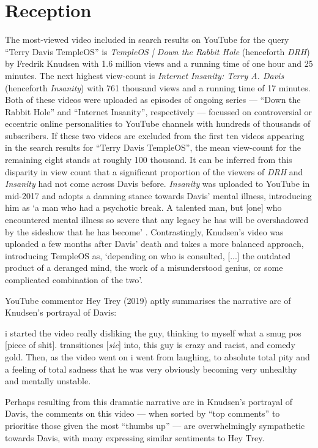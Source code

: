 \documentclass[Draft.tex]{subfiles}
\begin{document}
\section*{Reception}
The most-viewed video included in search results on YouTube
for the query ``Terry Davis TempleOS'' is
\textit{TempleOS | Down the Rabbit Hole} (henceforth \textit{DRH})
by Fredrik Knudsen with 1.6 million views
and a running time of one hour and 25 minutes.
The next highest view-count is \textit{Internet Insanity: Terry A. Davis}
(henceforth \textit{Insanity}) with 761 thousand views and a running time of 17 minutes.
Both of these videos were uploaded as episodes of ongoing series
--- ``Down the Rabbit Hole'' and ``Internet Insanity'', respectively ---
focussed on controversial or eccentric online personalities
to YouTube channels with hundreds of thousands of subscribers.
If these two videos are excluded from the first ten videos appearing
in the search results for ``Terry Davis TempleOS'', the mean view-count
for the remaining eight stands at roughly 100 thousand.
It can be inferred from this disparity in view count that a significant
proportion of the viewers of \textit{DRH} and \textit{Insanity}
had not come across Davis before.
\textit{Insanity} was uploaded to YouTube in mid-2017 and adopts a damning stance
towards Davis' mental illness, introducing him as
`a man who had a psychotic break.
A talented man, but [one] who encountered mental illness so severe
that any legacy he has will be overshadowed
by the sideshow that he has become' \parencite*{Metokur17}.
Contrastingly, Knudsen's \parencite*{Knudsen18} video
was uploaded a few months after Davis' death and
takes a more balanced approach, introducing TempleOS as,
`depending on who is consulted, [...] the outdated product of a deranged mind,
the work of a misunderstood genius, or some complicated combination of the two'.

YouTube commentor Hey Trey (2019) aptly summarises
the narrative arc of Knudsen's portrayal of Davis:
\begin{displayquote}
	i started the video really disliking the guy,
	thinking to myself what a smug pos [piece of shit].
	transitiones [\textit{sic}] into, this guy is crazy and racist, and comedy gold.
	Then, as the video went on i went from laughing, to absolute total pity
	and a feeling of total sadness that he was very obviously
	becoming very unhealthy and mentally unstable.\footnotemark
\end{displayquote}
Perhaps resulting from this dramatic narrative arc in Knudsen's portrayal of Davis,
the comments on this video --- when sorted by ``top comments''
to prioritise those given the most ``thumbs up'' ---
are overwhelmingly sympathetic towards Davis, with many expressing similar
sentiments to Hey Trey.
\end{document}
